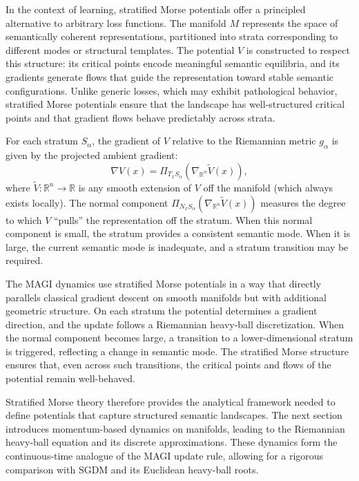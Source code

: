 \documentclass[12pt]{article}
\begin{document}
In the context of learning, stratified Morse potentials offer a principled alternative to arbitrary loss functions. The manifold $M$ represents the space of semantically coherent representations, partitioned into strata corresponding to different modes or structural templates. The potential $V$ is constructed to respect this structure: its critical points encode meaningful semantic equilibria, and its gradients generate flows that guide the representation toward stable semantic configurations. Unlike generic losses, which may exhibit pathological behavior, stratified Morse potentials ensure that the landscape has well-structured critical points and that gradient flows behave predictably across strata.

For each stratum $S_\alpha$, the gradient of $V$ relative to the Riemannian metric $g_\alpha$ is given by the projected ambient gradient:
\[
\nabla V(x) = \Pi_{T_x S_\alpha} \left( \nabla_{\mathbb{R}^n} \widetilde{V}(x) \right),
\]
where $\widetilde{V} : \mathbb{R}^n \to \mathbb{R}$ is any smooth extension of $V$ off the manifold (which always exists locally). The normal component $\Pi_{N_x S_\alpha} (\nabla_{\mathbb{R}^n} \widetilde{V}(x))$ measures the degree to which $V$ ``pulls'' the representation off the stratum. When this normal component is small, the stratum provides a consistent semantic mode. When it is large, the current semantic mode is inadequate, and a stratum transition may be required.

The MAGI dynamics use stratified Morse potentials in a way that directly parallels classical gradient descent on smooth manifolds but with additional geometric structure. On each stratum the potential determines a gradient direction, and the update follows a Riemannian heavy-ball discretization. When the normal component becomes large, a transition to a lower-dimensional stratum is triggered, reflecting a change in semantic mode. The stratified Morse structure ensures that, even across such transitions, the critical points and flows of the potential remain well-behaved.

Stratified Morse theory therefore provides the analytical framework needed to define potentials that capture structured semantic landscapes. The next section introduces momentum-based dynamics on manifolds, leading to the Riemannian heavy-ball equation and its discrete approximations. These dynamics form the continuous-time analogue of the MAGI update rule, allowing for a rigorous comparison with SGDM and its Euclidean heavy-ball roots.
\end{document}
